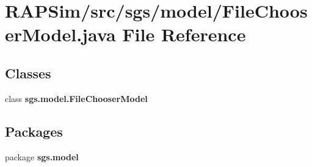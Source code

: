 \section{R\-A\-P\-Sim/src/sgs/model/\-File\-Chooser\-Model.java File Reference}
\label{_file_chooser_model_8java}
\subsection*{Classes}
\begin{DoxyCompactItemize}
\item 
class {\bf sgs.\-model.\-File\-Chooser\-Model}
\end{DoxyCompactItemize}
\subsection*{Packages}
\begin{DoxyCompactItemize}
\item 
package {\bf sgs.\-model}
\end{DoxyCompactItemize}
